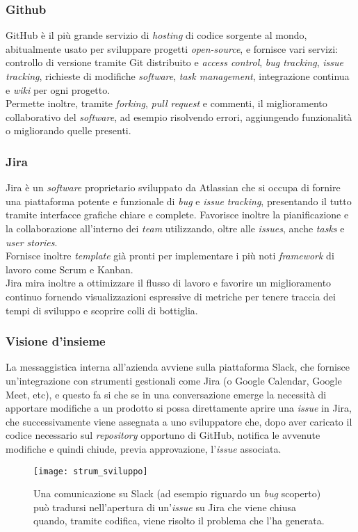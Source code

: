 \subsubsection{Github}
GitHub è il più grande servizio di \textit{hosting} di codice sorgente al mondo, abitualmente usato per sviluppare progetti \textit{open-source}, e fornisce vari servizi: controllo di versione tramite Git distribuito e \textit{access control}, \textit{bug tracking}, \textit{issue tracking}, richieste di modifiche \textit{software}, \textit{task management}, integrazione continua e \textit{wiki} per ogni progetto.\\ 
Permette inoltre, tramite \textit{forking}, \textit{pull request} e commenti, il miglioramento collaborativo del \textit{software}, ad esempio risolvendo errori, aggiungendo funzionalità o migliorando quelle presenti.

\subsubsection{Jira}
Jira è un \textit{software} proprietario sviluppato da Atlassian che si occupa di fornire una piattaforma potente e funzionale di \textit{bug} e \textit{issue tracking}, presentando il tutto tramite interfacce grafiche chiare e complete. Favorisce inoltre la pianificazione e la collaborazione all'interno dei \textit{team} utilizzando, oltre alle \textit{issues}, anche \textit{tasks} e \textit{user stories}.\\
Fornisce inoltre \textit{template} già pronti per implementare i più noti \textit{framework} di lavoro come Scrum e Kanban.\\
Jira mira inoltre a ottimizzare il flusso di lavoro e favorire un miglioramento continuo fornendo visualizzazioni espressive di metriche per tenere traccia dei tempi di sviluppo e scoprire colli di bottiglia.

\subsubsection{Visione d'insieme}
La messaggistica interna all'azienda avviene sulla piattaforma Slack, che fornisce un'integrazione con strumenti gestionali come Jira (o Google Calendar, Google Meet, etc), e questo fa si che se in una conversazione emerge la necessità di apportare modifiche a un prodotto si possa direttamente aprire una \textit{issue} in Jira, che successivamente viene assegnata a uno sviluppatore che, dopo aver caricato il codice necessario sul \textit{repository} opportuno di GitHub, notifica le avvenute modifiche e quindi chiude, previa approvazione, l'\textit{issue} associata.
\begin{figure}[H]
    \centering
    \texttt{[image: strum\_sviluppo]}
    \caption[Strumenti di sviluppo]{Una comunicazione su Slack (ad esempio riguardo un \textit{bug} scoperto) può tradursi nell'apertura di un'\textit{issue} su Jira che viene chiusa quando, tramite codifica, viene risolto il problema che l'ha generata.}
\end{figure}


